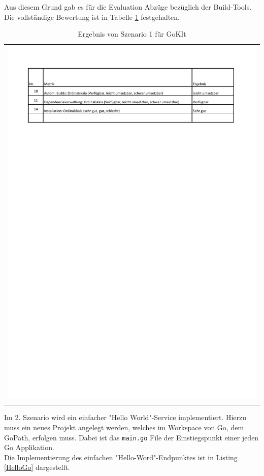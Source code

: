 Aus diesem Grund gab es für die Evaluation Abzüge bezüglich der Build-Tools. Die vollständige Bewertung ist in Tabelle \ref{Sz1ErgebnisGokit} festgehalten.

\begin{longtable}{c}
	\includegraphics[width=\linewidth]{Bilder/Sz1ErgebnisGokit.pdf} \\	
	\caption[Szenario 1 Ergebnis GoKit]{Ergebnis von Szenario 1 für GoKIt}
	\label{Sz1ErgebnisGokit}\\
\end{longtable}
\FloatBarrier

Im 2. Szenario wird ein einfacher "Hello World"-Service implementiert. Hierzu muss ein neues Projekt angelegt werden, welches im Workspace von Go, dem GoPath, erfolgen muss. Dabei ist das \lstinline|main.go| File der Einstiegspunkt einer jeden Go Applikation.\\
Die Implementierung des einfachen "Hello-Word"-Endpunktes ist in Listing \ref{HelloGo} dargestellt.

